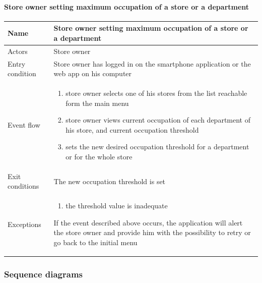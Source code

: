 \paragraph{Store owner setting maximum occupation of a store or a department}
\begin{flushleft}
	\begin{tabular} { | m{3cm} | m{10cm} | }
		\hline
		Name & Store owner setting maximum occupation of a store or a department\\
		\hline
		Actors & Store owner\\
		\hline
		Entry condition & Store owner has logged in on the smartphone application or the web app on his computer\\
		\hline
		Event flow & \begin{enumerate}
			\item store owner selects one of his stores from the list reachable form the main menu
			\item store owner views current occupation of each department of his store, and current occupation threshold
			\item sets the new desired occupation threshold for a department or for the whole store
		\end{enumerate}\\
		\hline
		Exit conditions & The new occupation threshold is set\\
		\hline
		Exceptions & \begin{enumerate}
			\item the threshold value is inadequate
		\end{enumerate}
		If the event described above occurs, the application will alert the store owner and provide him with the possibility to retry or go back to the initial menu\\
		\hline
	\end{tabular}
\end{flushleft}
\subsubsection{Sequence diagrams}
